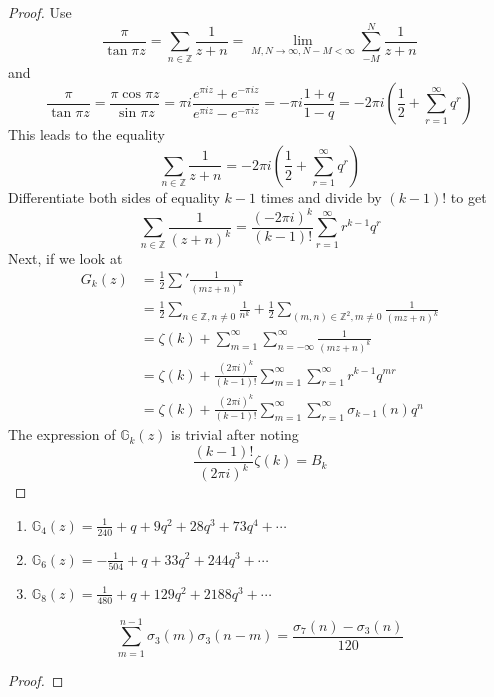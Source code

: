 \documentclass[oneside, 12pt]{scrbook}
\newcommand{\ZZ}{\mathbb Z}
\theoremstyle{theorem}
\begin{document}
\begin{proof}
Use $$\frac{\pi}{\tan \pi z} = \sum_{n \in \ZZ} \frac{1}{z+n} = \lim_{M,N \rightarrow \infty , N-M < \infty} \sum_{-M}^{N} \frac{1}{z+n}$$ and 
$$\frac{\pi}{\tan \pi z} = \frac{\pi \cos \pi z}{\sin \pi z} = \pi i \frac{e^{\pi i z} + e^{-\pi i z}}{e^{\pi i z} - e^{-\pi i z}} = - \pi i \frac{1+q}{1-q} = - 2 \pi i \left( \frac{1}{2} + \sum_{r=1}^{\infty} q^r \right)$$ This leads to the equality 
$$\sum_{n\in \ZZ}\frac{1}{z+n} = -  2 \pi i \left( \frac{1}{2} + \sum_{r=1}^{\infty} q^r \right)$$
Differentiate both sides of equality $k-1$ times and divide by $(k-1)!$ to get $$\sum_{n \in \ZZ}\frac{1}{(z+n)^k} = \frac{(-2 \pi i)^k}{(k-1)!} \sum_{r=1}^{\infty} r^{k-1}q^r$$
Next, if we look at 
\begin{align*}
G_{k}(z) &= \frac{1}{2} \sum' \frac{1}{(mz+n)^k} \\
&= \frac{1}{2} \sum_{n \in \ZZ , n \neq 0} \frac{1}{n^k} + \frac{1}{2} \sum_{(m,n) \in \ZZ^2 , m \neq 0} \frac{1}{(mz + n)^k} \\
&= \zeta(k) + \sum_{m=1}^{\infty} \sum_{n=-\infty}^{\infty} \frac{1}{(mz+n)^k} \\
&= \zeta(k) + \frac{(2 \pi i)^k}{(k-1)!} \sum_{m=1}^{\infty} \sum_{r=1}^{\infty} r^{k-1} q^{mr} \\
&= \zeta(k) + \frac{(2 \pi i)^k}{(k-1)!} \sum_{m=1}^{\infty} \sum_{r=1}^{\infty} \sigma_{k-1}(n) q^{n}
\end{align*}
The expression of $\mathbb{G}_{k}(z)$ is trivial after noting $$\frac{(k-1)!}{(2 \pi i)^k} \zeta(k) = B_{k}$$
\end{proof} 

\begin{remark}
\begin{enumerate}
\item $\mathbb{G}_{4}(z) = \frac{1}{240} + q + 9q^2 + 28q^3 + 73q^4 + \cdots $
\item $\mathbb{G}_{6}(z) = -\frac{1}{504} + q + 33q^2 + 244q^3 + \cdots $
\item $\mathbb{G}_{8}(z) = \frac{1}{480} + q + 129q^2 + 2188q^3 + \cdots $
\end{enumerate}
\end{remark}

\begin{proposition}
$$\sum_{m=1}^{n-1} \sigma_{3}(m) \sigma_{3}(n-m) = \frac{\sigma_{7}(n) - \sigma_{3}(n)}{120}$$
\end{proposition}

\begin{proof}

\end{proof}
\end{document}

